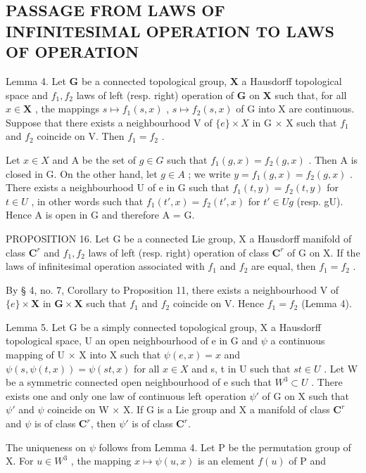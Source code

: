 \subsection{PASSAGE FROM LAWS OF INFINITESIMAL OPERATION TO LAWS OF OPERATION}

Lemma 4. Let \(\mathbf{G}\) be a connected topological group, \(\mathbf{X}\) a Hausdorff topological space and \(f_{1}, f_{2}\) laws of left (resp. right) operation of \(\mathbf{G}\) on \(\mathbf{X}\) such that, for all \(x \in \mathbf{X}\) , the mappings \(s \mapsto f_1(s, x)\) , \(s \mapsto f_2(s, x)\) of G into X are continuous. Suppose that there exists a neighbourhood V of \(\{e\} \times X\) in G \(\times\) X such that \(f_1\) and \(f_2\) coincide on V. Then \(f_1 = f_2\) .

Let \(x \in X\) and A be the set of \(g \in G\) such that \(f_{1}(g, x) = f_{2}(g, x)\) . Then A is closed in G. On the other hand, let \(g \in A\) ; we write \(y = f_{1}(g, x) = f_{2}(g, x)\) . There exists a neighbourhood U of e in G such that \(f_{1}(t, y) = f_{2}(t, y)\) for \(t \in U\) , in other words such that \(f_{1}(t', x) = f_{2}(t', x)\) for \(t' \in Ug\) (resp. gU). Hence A is open in G and therefore A = G.

PROPOSITION 16. Let G be a connected Lie group, X a Hausdorff manifold of class \(\mathbf{C}^r\) and \(f_1, f_2\) laws of left (resp. right) operation of class \(\mathbf{C}^r\) of G on X. If the laws of infinitesimal operation associated with \(f_1\) and \(f_2\) are equal, then \(f_1 = f_2\) .

By § 4, no. 7, Corollary to Proposition 11, there exists a neighbourhood V of \(\{e\} \times \mathbf{X}\) in \(\mathbf{G} \times \mathbf{X}\) such that \(f_{1}\) and \(f_{2}\) coincide on V. Hence \(f_{1} = f_{2}\) (Lemma 4).

Lemma 5. Let G be a simply connected topological group, X a Hausdorff topological space, U an open neighbourhood of e in G and \(\psi\) a continuous mapping of U × X into X such that \(\psi(e, x) = x\) and \(\psi(s, \psi(t, x)) = \psi(st, x)\) for all \(x \in X\) and s, t in U such that \(st \in U\) . Let W be a symmetric connected open neighbourhood of e such that \(W^{3} \subset U\) . There exists one and only one law of continuous left operation \(\psi'\) of G on X such that \(\psi'\) and \(\psi\) coincide on W × X. If G is a Lie group and X a manifold of class \(\mathbf{C}^r\) and \(\psi\) is of class \(\mathbf{C}^r\), then \(\psi'\) is of class \(\mathbf{C}^r\).

The uniqueness on \(\psi\) follows from Lemma 4. Let P be the permutation group of X. For \(u \in W^{3}\) , the mapping \(x \mapsto \psi(u, x)\) is an element \(f(u)\) of P and


